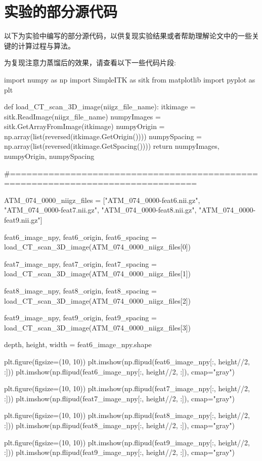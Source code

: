 
\chapter{实验的部分源代码}\label{chap:reproduce_experiment}

以下为实验中编写的部分源代码，以供复现实验结果或者帮助理解论文中的一些关键的计算过程与算法。

为复现注意力蒸馏后的效果，请查看以下一些代码片段:
\begin{codeblock}[language=python]

import numpy as np
import SimpleITK as sitk
from matplotlib import pyplot as plt

def load_CT_scan_3D_image(niigz_file_name):
    itkimage = sitk.ReadImage(niigz_file_name)
    numpyImages = sitk.GetArrayFromImage(itkimage)
    numpyOrigin = np.array(list(reversed(itkimage.GetOrigin())))
    numpySpacing = np.array(list(reversed(itkimage.GetSpacing())))
    return numpyImages, numpyOrigin, numpySpacing

#================================================================================

ATM_074_0000_niigz_files = ["ATM_074_0000-feat6.nii.gz", 
                            "ATM_074_0000-feat7.nii.gz", 
                            "ATM_074_0000-feat8.nii.gz", 
                            "ATM_074_0000-feat9.nii.gz"]

feat6_image_npy, feat6_origin, feat6_spacing = 
	load_CT_scan_3D_image(ATM_074_0000_niigz_files[0])

feat7_image_npy, feat7_origin, feat7_spacing = 
	load_CT_scan_3D_image(ATM_074_0000_niigz_files[1])

feat8_image_npy, feat8_origin, feat8_spacing = 
	load_CT_scan_3D_image(ATM_074_0000_niigz_files[2])

feat9_image_npy, feat9_origin, feat9_spacing = 
	load_CT_scan_3D_image(ATM_074_0000_niigz_files[3])
	

depth, height, width = feat6_image_npy.shape

plt.figure(figsize=(10, 10))
plt.imshow(np.flipud(feat6_image_npy[:, height//2, :]))
plt.imshow(np.flipud(feat6_image_npy[:, height//2, :]), cmap="gray")

plt.figure(figsize=(10, 10))
plt.imshow(np.flipud(feat7_image_npy[:, height//2, :]))
plt.imshow(np.flipud(feat7_image_npy[:, height//2, :]), cmap="gray")

plt.figure(figsize=(10, 10))
plt.imshow(np.flipud(feat8_image_npy[:, height//2, :]))
plt.imshow(np.flipud(feat8_image_npy[:, height//2, :]), cmap="gray")

plt.figure(figsize=(10, 10))
plt.imshow(np.flipud(feat9_image_npy[:, height//2, :]))
plt.imshow(np.flipud(feat9_image_npy[:, height//2, :]), cmap="gray")
\end{codeblock}


